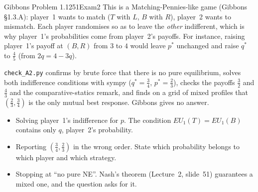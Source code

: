 \begin{exsol}{Gibbons Problem 1.12}{51}{Exam}{2}
\interp This is a Matching-Pennies-like game (Gibbons \S1.3.A): player~1 wants to match
($T$ with $L$, $B$ with $R$), player~2 wants to mismatch. Each player randomises so as to leave the
\emph{other} indifferent, which is why player~1's probabilities come from player~2's payoffs. For
instance, raising player~1's payoff at $(B,R)$ from $3$ to $4$ would leave $p^*$ unchanged and
raise $q^*$ to $\tfrac45$ (from $2q = 4 - 3q$).

\verify \texttt{check\_A2.py} confirms by brute force that there is no pure equilibrium, solves both
indifference conditions with sympy ($q^* = \tfrac34$, $p^* = \tfrac23$), checks the payoffs
$\tfrac32$ and $\tfrac43$ and the comparative-statics remark, and finds on a grid of mixed profiles
that $(\tfrac23, \tfrac34)$ is the only mutual best response. Gibbons gives no answer.

\mistakes
\begin{itemize}
  \item Solving player~1's indifference for $p$. The condition $EU_1(T) = EU_1(B)$ contains only
  $q$, player~2's probability.
  \item Reporting $(\tfrac34, \tfrac23)$ in the wrong order. State which probability belongs to
  which player and which strategy.
  \item Stopping at ``no pure NE''. Nash's theorem (Lecture~2, slide~51) guarantees a mixed one, and
  the question asks for it.
\end{itemize}

\end{exsol}
